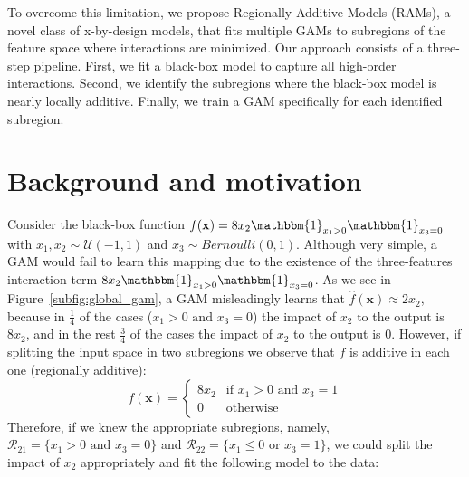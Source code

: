 \documentclass[12pt]{article}
\newcommand{\xb}{\mathbf{x}}
\newcommand{\when}[1]{\mathbbm{1}_{#1}}
\begin{document}
To overcome this limitation, we propose Regionally Additive Models (RAMs), a novel class of x-by-design models,
that fits multiple GAMs to subregions of the feature space where interactions are minimized.
Our approach consists of a three-step pipeline.
First, we fit a black-box model to capture all high-order interactions.
Second, we identify the subregions where the black-box model is nearly locally additive.
Finally, we train a GAM specifically for each identified subregion.

\section{Background and motivation}
\label{sec:motivation}

Consider the black-box function \(f(\xb) = 8x_2\when{x_1 > 0}\when{x_3=0}\)
with \(x_1, x_2 \sim \mathcal{U}(-1,1)\) and \(x_3 \sim Bernoulli(0,1)\).
Although very simple, a GAM would fail to learn this mapping due to
the existence of the three-features interaction term $8x_2\when{x_1 > 0}\when{x_3=0}$.
As we see in Figure~\ref{subfig:global_gam}, a GAM misleadingly learns that $\hat{f}(\xb) \approx 2x_2$,
because in $\frac{1}{4}$ of the cases ($x_1 > 0 \text{ and } x_3 = 0$) the impact of $x_2$ to the output is $8x_2$,
and in the rest $\frac{3}{4}$ of the cases the impact of $x_2$ to the output is $0$.
However, if splitting the input space in two subregions we observe that \(f\) is additive in each one (regionally additive):
%
\begin{equation}
    \label{eq:regionally_additive}
    f(\xb) = \begin{cases} 8x_2 & \text{if } x_1 > 0 \text{ and } x_3 = 1 \\ 0 & \text{otherwise} \end{cases}
\end{equation}
%
Therefore, if we knew the appropriate subregions,
namely, \(\mathcal{R}_{21} = \{x_1 > 0 \text{ and } x_3 = 0\}\)
and  \(\mathcal{R}_{22} = \{x_1 \leq 0 \text{ or } x_3 = 1\}\),
we could split the impact of $x_2$ appropriately and fit the following model to the data:
\end{document}
